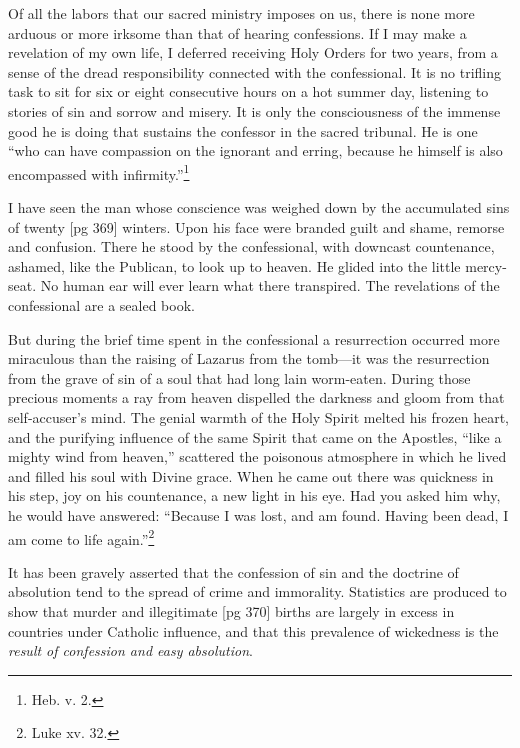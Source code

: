 Of all the labors that our sacred ministry imposes
on us, there is none more arduous or more
irksome than that of hearing confessions. If I may
make a revelation of my own life, I deferred receiving
Holy Orders for two years, from a sense of
the dread responsibility connected with the confessional.
It is no trifling task to sit for six or eight
consecutive hours on a hot summer day, listening
to stories of sin and sorrow and misery. It is only
the consciousness of the immense good he is doing
that sustains the confessor in the sacred tribunal.
He is one “who can have compassion on the ignorant
and erring, because he himself is also encompassed
with infirmity.”\footnote{Heb. v. 2.}

I have seen the man whose conscience was
weighed down by the accumulated sins of twenty
[pg 369]
winters. Upon his face were branded guilt and
shame, remorse and confusion. There he stood by
the confessional, with downcast countenance,
ashamed, like the Publican, to look up to heaven.
He glided into the little mercy-seat. No human
ear will ever learn what there transpired. The
revelations of the confessional are a sealed book.

But during the brief time spent in the confessional
a resurrection occurred more miraculous
than the raising of Lazarus from the tomb—it was
the resurrection from the grave of sin of a soul
that had long lain worm-eaten. During those
precious moments a ray from heaven dispelled the
darkness and gloom from that self-accuser's mind.
The genial warmth of the Holy Spirit melted his
frozen heart, and the purifying influence of the
same Spirit that came on the Apostles, “like a
mighty wind from heaven,” scattered the poisonous
atmosphere in which he lived and filled his soul
with Divine grace. When he came out there was
quickness in his step, joy on his countenance, a
new light in his eye. Had you asked him why, he
would have answered: “Because I was lost, and
am found. Having been dead, I am come to life
again.”\footnote{Luke xv. 32.}


It has been gravely asserted that the confession
of sin and the doctrine of absolution tend to the
spread of crime and immorality. Statistics are
produced to show that murder and illegitimate
[pg 370]
births are largely in excess in countries under
Catholic influence, and that this prevalence of
wickedness is the \emph{result of confession and easy
absolution}.

